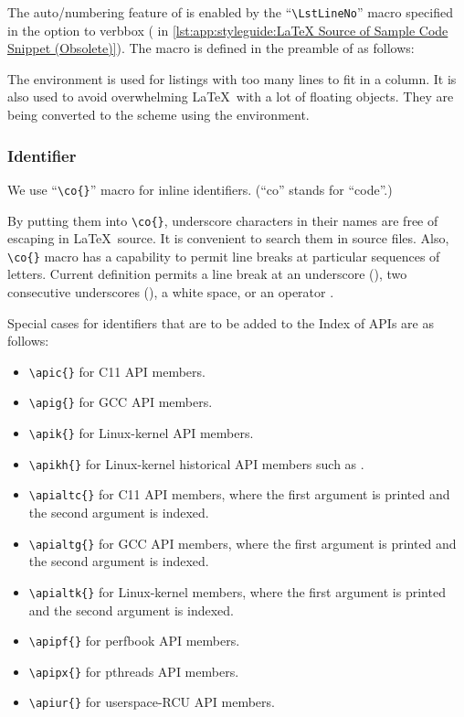 

The auto\-/numbering feature of  is enabled by
the ``\verb|\LstLineNo|'' macro specified in the option to verbbox
( in
\cref{lst:app:styleguide:LaTeX Source of Sample Code Snippet (Obsolete)}).
The macro is defined in the preamble of 
as follows:

\begin{VerbatimU}
\newcommand{\LstLineNo}
  {\makebox[5ex][r]{\arabic{VerbboxLineNo}\hspace{2ex}}}
\end{VerbatimU}

The  environment is used for listings with too many lines
to fit in a column.
It is also used to avoid overwhelming \LaTeX\ with a lot of floating objects.
They are being converted to the scheme using the  environment.

\subsubsection{Identifier}
\label{sec:app:styleguide:Identifier}

We use ``\verb|\co{}|'' macro for inline identifiers.
(``co'' stands for ``code''.)

By putting them into \verb|\co{}|, underscore characters in
their names are free of escaping in \LaTeX\ source.
It is convenient to search them in source files.
Also, \verb|\co{}| macro has a capability to permit line breaks
at particular sequences of letters.
Current definition permits a line break at an underscore (\tco{_}),
two consecutive underscores (\tco{__}), a white space, or an
operator \tco{->}.

Special cases for identifiers that are to be added to the Index of
APIs are as follows:

\begin{itemize}
\item	\verb|\apic{}| for C11 API members.
\item	\verb|\apig{}| for GCC API members.
\item	\verb|\apik{}| for Linux-kernel API members.
\item	\verb|\apikh{}| for Linux-kernel historical API members
  	such as .
\item	\verb|\apialtc{}| for C11 API members, where the first argument
  	is printed and the second argument is indexed.
\item	\verb|\apialtg{}| for GCC API members, where the first argument
  	is printed and the second argument is indexed.
\item	\verb|\apialtk{}| for Linux-kernel members, where the first argument
  	is printed and the second argument is indexed.
\item	\verb|\apipf{}| for perfbook API members.
\item	\verb|\apipx{}| for pthreads API members.
\item	\verb|\apiur{}| for userspace-RCU API members.
\end{itemize}


